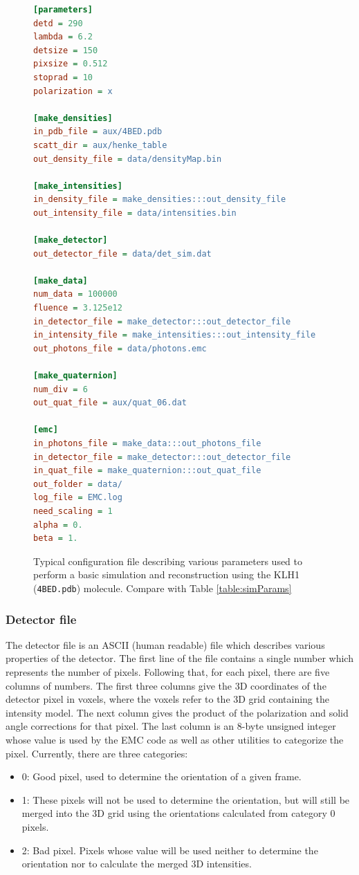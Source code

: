 \documentclass[]{iucr}              %
\begin{document}
\begin{figure}
\begin{lstlisting}[language=ini]
[parameters]
detd = 290
lambda = 6.2
detsize = 150
pixsize = 0.512
stoprad = 10
polarization = x

[make_densities]
in_pdb_file = aux/4BED.pdb
scatt_dir = aux/henke_table
out_density_file = data/densityMap.bin

[make_intensities]
in_density_file = make_densities:::out_density_file
out_intensity_file = data/intensities.bin

[make_detector]
out_detector_file = data/det_sim.dat

[make_data]
num_data = 100000
fluence = 3.125e12
in_detector_file = make_detector:::out_detector_file
in_intensity_file = make_intensities:::out_intensity_file
out_photons_file = data/photons.emc

[make_quaternion]
num_div = 6
out_quat_file = aux/quat_06.dat

[emc]
in_photons_file = make_data:::out_photons_file
in_detector_file = make_detector:::out_detector_file
in_quat_file = make_quaternion:::out_quat_file
out_folder = data/
log_file = EMC.log
need_scaling = 1
alpha = 0.
beta = 1.
\end{lstlisting}
\caption{Typical configuration file describing various parameters used to perform a basic simulation and reconstruction using the KLH1 (\texttt{4BED.pdb}) molecule. Compare with Table \ref{table:simParams}}
\label{fig:config}
\end{figure}

\subsubsection{Detector file}
\label{subsec:detector}
The detector file is an ASCII (human readable) file which describes various properties of the detector. The first line of the file contains a single number which represents the number of pixels. Following that, for each pixel, there are five columns of numbers. The first three columns give the 3D coordinates of the detector pixel in voxels, where the voxels refer to the 3D grid containing the intensity model. The next column gives the product of the polarization and solid angle corrections for that pixel. The last column is an 8-byte unsigned integer whose value is used by the EMC code as well as other utilities to categorize the pixel. Currently, there are three categories:
\begin{itemize}
\item 0: Good pixel, used to determine the orientation of a given frame.
\item 1: These pixels will not be used to determine the orientation, but will still be merged into the 3D grid using the orientations calculated from category 0 pixels.
\item 2: Bad pixel. Pixels whose value will be used neither to determine the orientation nor to calculate the merged 3D intensities.
\end{itemize}
\end{document}
